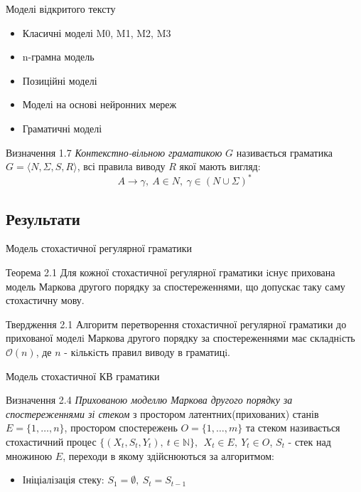 \documentclass{beamer}
\begin{document}
\begin{darkframes}
    \begin{frame}{Моделі відкритого тексту}
      \begin{itemize}
        \item Класичні моделі M0, M1, M2, M3
        \item n-грамна модель
        \item Позиційні моделі
        \item Моделі на основі нейронних мереж
        \item Граматичні моделі
      \end{itemize}
      \begin{exampleblock}{Визначення 1.7}
      \textit{Контекстно-вільною граматикою} $G$ називається граматика $ G = \big\langle N, \Sigma, S, R \big\rangle $, всі правила виводу $R$ якої мають вигляд:
      $$ A \rightarrow \gamma,\ A \in N,\ \gamma \in \left(N \cup \Sigma \right)^* $$
      \end{exampleblock}
    \end{frame}

    \subsection{Результати}
    \begin{frame}{Модель стохастичної регулярної граматики}
      \begin{block}{Теорема 2.1}
        Для кожної стохастичної регулярної граматики iснує прихована модель Маркова другого порядку за спостереженнями, що допускає таку саму стохастичну мову.
      \end{block}
      \begin{block}{Твердження 2.1}
        Алгоритм перетворення стохастичної регулярної граматики до прихованої моделi Маркова другого порядку за спостереженнями має складнiсть $\mathcal{O}(n)$, де $n$ - кiлькiсть правил виводу в
        граматицi.
      \end{block}
    \end{frame}

    \begin{frame}{Модель стохастичної КВ граматики}
      \begin{exampleblock}{Визначення 2.4}
        \textit{Прихованою моделлю Маркова другого порядку за спостереженнями зі стеком} з простором латентних(прихованих) станів $E = \{ 1,\dots,n \}$, простором спостережень $O = \{ 1,\dots,m \}$ та стеком  називається стохастичний процес $ \{ (X_t, S_t, Y_t),\ t \in \mathbb{N} \},\ \ X_t \in E,\ Y_t \in O $, $S_t$ - стек над множиною $E$, переходи в якому здійснюються за алгоритмом:
        \begin{itemize}
          \item Ініціалізація стеку: $S_1 = \emptyset,\ S_t = S_{t-1}$


\end{itemize}
\end{exampleblock}
\end{frame}
\end{darkframes}
\end{document}
